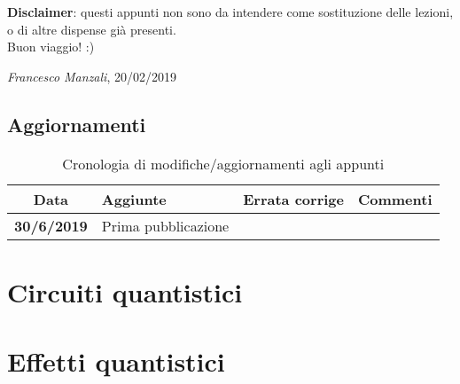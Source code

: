 \documentclass[12pt]{report} %
\theoremstyle{plain}
\theoremstyle{definition}
\theoremstyle{remark}
\begin{document}
\textbf{Disclaimer}: questi appunti non sono da intendere come sostituzione delle lezioni, o di altre dispense già presenti.\\
Buon viaggio! :)

\begin{flushright}
\textit{Francesco Manzali}, 20/02/2019
\end{flushright}
\clearpage
\section*{Aggiornamenti}
\begin{table}[hb]
    \centering
    \begin{tabular}{|cm{3cm}m{5cm}m{3cm}|}\toprule
        Data & Aggiunte & Errata corrige & Commenti\\\midrule
        \textbf{30/6/2019} & Prima pubblicazione & & \\
        \bottomrule
    \end{tabular}
    \caption{Cronologia di modifiche/aggiornamenti agli appunti}
    \label{updates}
\end{table}

\clearpage

\chapter{Circuiti quantistici}




\chapter{Effetti quantistici}








 










\end{document}

